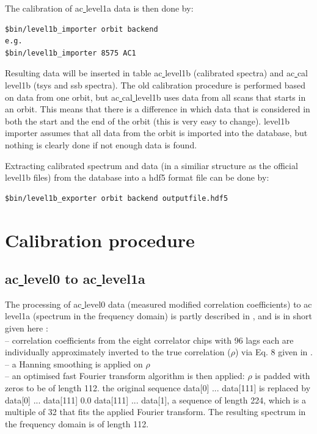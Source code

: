 \documentclass[12pt]{article}
\begin{document}
The calibration of ac\underline{ }level1a data is then done by:
\begin{verbatim}
$bin/level1b_importer orbit backend
e.g.
$bin/level1b_importer 8575 AC1
\end{verbatim}
Resulting data will be inserted in table ac\underline{ }level1b 
(calibrated spectra) and
ac\underline{ }cal\underline{ }level1b (tsys and ssb spectra). 
The old calibration procedure is performed based on data from
one orbit, but ac\underline{ }cal\underline{ }level1b
uses data from all scans that starts in an orbit.
This means that there is a difference in which data
that is considered in both the start and the end of the orbit
(this is very easy to change). 
level1b\underline{ }importer assumes that all data from the orbit
is imported into the database, but nothing is clearly done if not
enough data is found.
 
Extracting calibrated spectrum and data (in a similiar structure as 
the official level1b files)
from the database into a hdf5 format
file can be done by:
\begin{verbatim}
$bin/level1b_exporter orbit backend outputfile.hdf5
\end{verbatim}

\section{Calibration procedure}
\label{sec:cal}

\subsection{ac\underline{ }level0 to ac\underline{ }level1a}
The processing of ac\underline{ }level0 data
(measured modified correlation coefficients)
to ac\underline{ }level1a (spectrum in the frequency domain)
is partly described in \cite{notes}, and is in short given here :\\
-- correlation coefficients from the eight correlator chips
with 96 lags each are individually approximately inverted to
the true correlation (\(\rho\)) via Eq. 8 given in \cite{notes}.\\
-- a Hanning smoothing is applied on \(\rho\)\\
-- an optimised fast Fourier transform algorithm is then applied:
\(\rho\) is padded with zeros to be of length 112.
the original sequence data[0] ... data[111] is replaced by 
data[0] ... data[111] 0.0 data[111] ... data[1], a sequence of length 
224, which is a multiple of 32 that fits the applied Fourier transform.
The resulting spectrum in the frequency domain is of length
112.  
\end{document}
